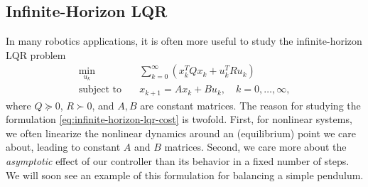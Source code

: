 \documentclass[
]{book}
\theoremstyle{definition}
\theoremstyle{definition}
\theoremstyle{definition}
\theoremstyle{definition}
\theoremstyle{remark}
\begin{document}
\hypertarget{infinite-horizon-lqr}{%
\subsection{Infinite-Horizon LQR}\label{infinite-horizon-lqr}}

In many robotics applications, it is often more useful to study the infinite-horizon LQR problem
\begin{align}
\min_{u_k} & \quad  \sum_{k=0}^{\infty} \left( x_k^T Q x_k + u_k^T R u_k \right) \label{eq:infinite-horizon-lqr-cost} \\
\text{subject to} & \quad x_{k+1} = A x_k + B u_k, \quad k=0,\dots,\infty, \label{eq:infinite-horizon-lqr-system}
\end{align}
where \(Q \succeq 0\), \(R \succ 0\), and \(A,B\) are constant matrices. The reason for studying the formulation \eqref{eq:infinite-horizon-lqr-cost} is twofold. First, for nonlinear systems, we often linearize the nonlinear dynamics around an (equilibrium) point we care about, leading to constant \(A\) and \(B\) matrices. Second, we care more about the \emph{asymptotic} effect of our controller than its behavior in a fixed number of steps. We will soon see an example of this formulation for balancing a simple pendulum.
\end{document}
